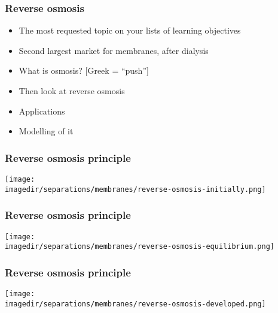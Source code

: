 \begin{frame}\frametitle{Reverse osmosis}
	\begin{itemize}
		\item	The most requested topic on your lists of learning objectives
		\item	Second largest market for membranes, after dialysis
		\item	What is osmosis? [Greek = ``push'']
		\item	Then look at reverse osmosis
		\item	Applications
		\item	Modelling of it
	\end{itemize}	
\end{frame}

\begin{frame}\frametitle{Reverse osmosis principle}
	\vfill
	\begin{center}
		\texttt{[image: \\imagedir/separations/membranes/reverse-osmosis-initially.png]}
	\end{center}
\end{frame}

\begin{frame}\frametitle{Reverse osmosis principle}
	\vfill
	\begin{center}
		\texttt{[image: \\imagedir/separations/membranes/reverse-osmosis-equilibrium.png]}
	\end{center}
\end{frame}

\begin{frame}\frametitle{Reverse osmosis principle}
	\vfill
	\begin{center}
		\texttt{[image: \\imagedir/separations/membranes/reverse-osmosis-developed.png]}
	\end{center}
\end{frame}

